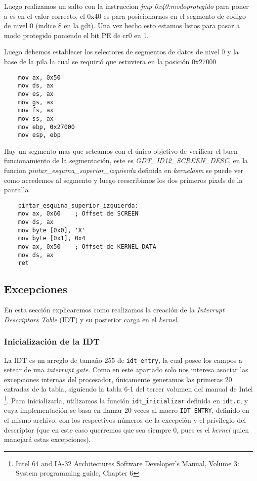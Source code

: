 Luego realizamos un salto con la instruccion \textit{jmp 0x40:modoprotegido} para poner a cs en el valor correcto, el 0x40 es para posicionarnos en el segmento de codigo de nivel 0 (indice 8 en la gdt). Una vez hecho esto estamos listos para pasar a modo protegido poniendo el bit PE de cr0 en 1. 

Luego debemos establecer los selectores de segmentos de datos de nivel 0 y la base de la pila la cual se requirió que estuviera en la posición 0x27000

\begin{lstlisting}
	mov ax, 0x50	
	mov ds, ax
	mov es, ax
	mov gs, ax
	mov fs, ax
	mov ss, ax
	mov ebp, 0x27000
	mov esp, ebp
\end{lstlisting}

Hay un segmento mas que seteamos con el único objetivo de verificar el buen funcionamiento de la segmentación, este es \textit{GDT\_ID12\_SCREEN\_DESC}, en la funcion \textit{pintar\_esquina\_superior\_izquierda} definida en \textit{kernelasm} se puede ver como accedemos al segmento y luego reescribimos los dos primeros pixels de la pantalla

\begin{lstlisting}
	pintar_esquina_superior_izquierda:
	mov ax, 0x60	; Offset de SCREEN
	mov ds, ax
	mov byte [0x0], 'X'
	mov byte [0x1], 0x4
	mov ax, 0x50	; Offset de KERNEL_DATA
	mov ds, ax
	ret	
\end{lstlisting}

\subsection{Excepciones}
\label{subsec:excepciones}
En esta sección explicaremos como realizamos la creación de la \textit{Interrupt Descriptors Table} (IDT) y su posterior carga en el \textit{kernel}.

\subsubsection{Inicialización de la IDT}
La IDT es un arreglo de tamaño 255 de \texttt{idt\_entry}, la cual posee los campos a setear de una \textit{interrupt gate}. Como en este apartado solo nos interesa asociar las excepciones internas del procesador, únicamente generamos las primeras 20 entradas de la tabla, siguiendo la tabla 6-1 del tercer volumen del manual de Intel \footnote{Intel 64 and IA-32 Architectures Software Developer's Manual, Volume 3: System programming guide, Chapter 6}. Para inicializarla, utilizamos la función \texttt{idt\_inicializar} definida en \texttt{idt.c}, y cuya implementación se basa en llamar 20 veces al macro \texttt{IDT\_ENTRY}, definido en el mismo archivo, con los respectivos números de la excepción y el privilegio del descriptor (que en este caso querremos que sea siempre 0, pues es el \textit{kernel} quien manejará estas excepciones).

